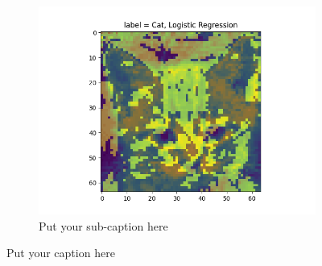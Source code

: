 \documentclass{article}
\begin{document}
\begin{figure}[H]
\begin{subfigure}{.33\textwidth}
  \centering
  \includegraphics[width=1\linewidth]{1e/Cats 5 clusters/impfeat LogReg.png}  
  \caption{Put your sub-caption here}
  \label{LogReg cat}
\end{subfigure}
\caption{Put your caption here}
\label{example dog}
\end{figure}
\end{document}
